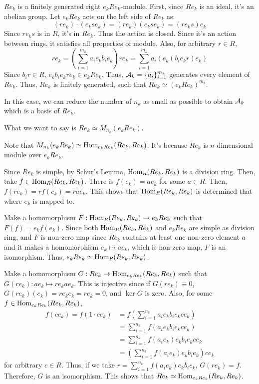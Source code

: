 \(Re_k\) is a finitely generated right \(e_k Re_k\)-module.
First, since \(Re_k\) is an ideal, it's an abelian group.
Let \(e_k Re_k\) acts on the left side of \(Re_k\) as:
\[(re_k) \cdot (e_k se_k) = (re_k)(e_k se_k) = (re_k s)e_k\]
Since \(re_ks\) is in \(R\), it's in \(Re_k\).
Thus the action is closed.
Since it's an action between rings,
it satisfies all properties of module.
Also, for arbitrary \(r \in R\),
\[re_k = \left(\sum_{i=1}^{m_k} a_i e_k b_i e_k\right) re_k
= \sum_{i=1}^{m_k} a_i (e_k (b_i e_k r) e_k) \]
Since \(b_i r \in R\), \(e_k b_i e_k r e_k \in e_k R e_k\).
Thus, \(\mathcal{A}_k = \{a_i\}_{i=1}^{m_k}\) generates every element
of \(Re_k\).
Thus, \(Re_k\) is finitely generated,
such that \(Re_k \simeq (e_k R e_k)^{m_k}\).

In this case, we can reduce the number of \(n_k\) as small as possible
to obtain \(\mathcal{A}_k\) which is a basis of \(Re_k\).

What we want to say is \(Re_k \simeq M_{n_k}(e_k R e_k)\).

Note that \(M_{n_k}(e_k R e_k) \simeq \textnormal{Hom}_{e_k R e_k}(Re_k, Re_k)\).
It's because \(Re_k\) is \(n\)-dimensional module over \(e_k R e_k\).


Since \(Re_k\) is simple,
by Schur's Lemma,
\(\textnormal{Hom}_R(Re_k, Re_k)\) is a division ring.
Then, take \(f \in \textnormal{Hom}_R(Re_k, Re_k)\).
There is \(f(e_k) = ae_k\) for some \(a \in R\).
Then, \(f(re_k) = rf(e_k) = rae_k\).
This shows that \(\textnormal{Hom}_R(Re_k, Re_k)\)
is determined that where \(e_k\) is mapped to.

Make a homomorphism \(F: \textnormal{Hom}_R(Re_k, Re_k) \to e_k R e_k\)
such that \(F(f) = e_k f(e_k)\).
Since both \(\textnormal{Hom}_R(Re_k, Re_k)\) and \(e_k R e_k\) are simple as division ring,
and \(F\) is non-zero map since \(R e_k\) contains at least one non-zero
element \(a\) and it makes a homomorphism \(e_k \mapsto a e_k\), which 
is non-zero map,
\(F\) is an isomorphism.
Thus, \(e_k R e_k \simeq \textnormal{Hom}_R(Re_k, Re_k)\).

Make a homomorphism \(G: Re_k \to \textnormal{Hom}_{e_k R e_k}(Re_k, Re_k)\)
such that \(G(re_k): ae_k \mapsto re_k ae_k\).
This is injective since if \(G(re_k) \equiv 0\),
\(G(re_k)(e_k) = re_k e_k = re_k = 0\),
and \(\ker G\) is zero.
Also, for some \(f \in \textnormal{Hom}_{e_k R e_k}(Re_k, Re_k)\),
\begin{align*}
  f(c e_k) = f(1 \cdot ce_k)
  &= f(\sum_{i=1}^{n_k} a_i e_k b_i e_k c e_k)
  \\&= \sum_{i=1}^{n_k} f(a_i e_k b_i e_k c e_k)
  \\&= \sum_{i=1}^{n_k} f(a_i e_k) e_k b_i e_k c e_k
  \\&= \left(\sum_{i=1}^{n_k} f(a_i e_k) e_k b_i e_k\right) c e_k
\end{align*}
for arbitrary \(c \in R\).
Thus, if we take \(r = \sum_{i=1}^{n_k} f(a_i e_k) e_k b_i e_k\),
\(G(r e_k) = f\).
Therefore, \(G\) is an isomorphism.
This shows that \(Re_k \simeq \textnormal{Hom}_{e_k R e_k}(Re_k, Re_k)\).

